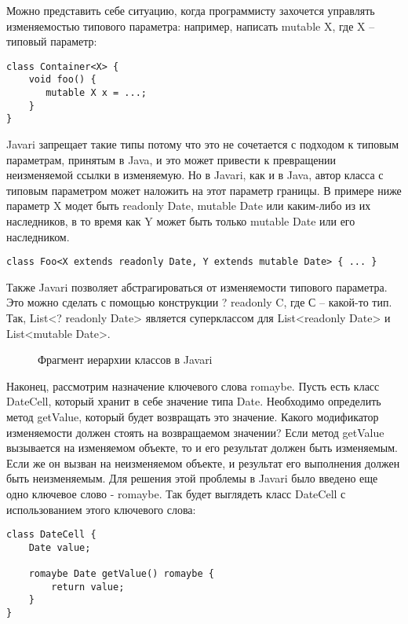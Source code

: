 Можно представить себе ситуацию, когда программисту захочется управлять изменяемостью типового параметра: например, написать mutable X, где X -- типовый параметр:

\begin{lstlisting}[caption=Модификаторы изменяемости и типовые параметры, label=code:javari_generic_mutable]
class Container<X> {
    void foo() {
       mutable X x = ...;
    }
}
\end{lstlisting} 

Javari запрещает такие типы потому что это не сочетается с подходом к типовым параметрам, принятым в Java, и это может привести к превращении неизменяемой ссылки в изменяемую. Но в Javari, как и в Java, автор класса с типовым параметром может наложить на этот параметр границы. В примере ниже параметр X модет быть readonly Date, mutable Date или каким-либо из их наследников, в то время как Y может быть только mutable Date или его наследником. 

\begin{lstlisting}[caption=Объявление класса с типовыми параметрами, label=code:javari_generic_class]
class Foo<X extends readonly Date, Y extends mutable Date> { ... }
\end{lstlisting} 

Также Javari позволяет абстрагироваться от изменяемости типового параметра. Это можно сделать с помощью конструкции ? readonly C, где С -- какой-то тип. Так, List<? readonly Date> является суперклассом для List<readonly Date> и List<mutable Date>. 

\begin{figure}[h]
\caption{Фрагмент иерархии классов в Javari}
\label{pic:javari_list_classes}
\end{figure}


Наконец, рассмотрим назначение ключевого слова romaybe. Пусть есть класс DateCell, который хранит в себе значение типа Date. Необходимо определить метод getValue, который будет возвращать это значение. Какого модификатор изменяемости должен стоять на возвращаемом значении? Если метод getValue вызывается на изменяемом объекте, то и его результат должен быть изменяемым. Если же он вызван на неизменяемом объекте, и результат его выполнения должен быть неизменяемым. Для решения этой проблемы в Javari было введено еще одно ключевое слово - romaybe. Так будет выглядеть класс DateCell с использованием этого ключевого слова:

\begin{lstlisting}[caption=Ключевое слово romaybe, label=code:javari_romaybe]
class DateCell { 
    Date value; 
    
    romaybe Date getValue() romaybe { 
        return value; 
    }
}
\end{lstlisting}


